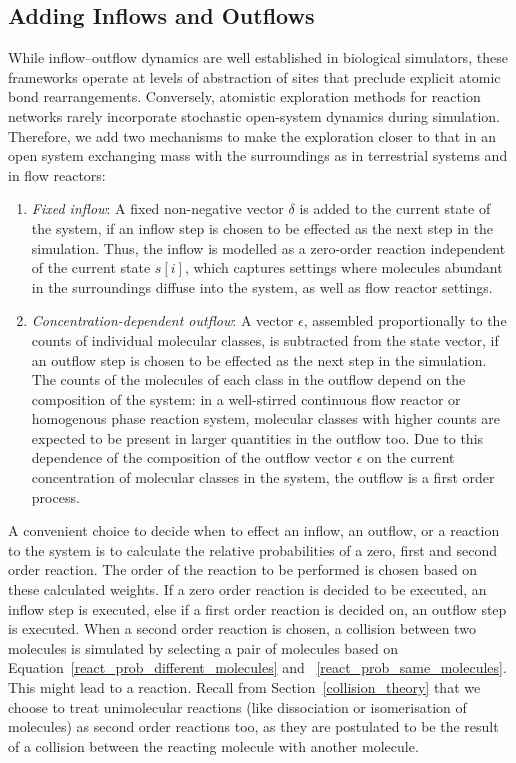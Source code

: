 \subsection{Adding Inflows and Outflows}
\label{sec:inflowOutflow}
While inflow–outflow dynamics are well established in biological simulators, these frameworks operate at levels of abstraction of sites that preclude explicit atomic bond rearrangements. Conversely, atomistic exploration methods for reaction networks rarely incorporate stochastic open-system dynamics during simulation.
Therefore, we add two mechanisms to make the exploration closer to that in an open system exchanging mass with the surroundings as in terrestrial systems and in flow reactors:

\begin{enumerate}
    \item \emph{Fixed inflow}: A fixed non-negative vector $\delta$ is added to the current state of the system, if an inflow step is chosen to be effected as the next step in the simulation. Thus, the inflow is modelled as a zero-order reaction independent of the current state $s[i]$, which captures settings where molecules abundant in the surroundings diffuse into the system, as well as flow reactor settings.
    
    \item \emph{Concentration-dependent outflow}: A vector $\epsilon$, assembled proportionally to the counts of individual molecular classes, is subtracted from the state vector, if an outflow step is chosen to be effected as the next step in the simulation. The counts of the molecules of each class in the outflow depend on the composition of the system: in a well-stirred continuous flow reactor or homogenous phase reaction system, molecular classes with higher counts are expected to be present in larger quantities in the outflow too. Due to this dependence of the composition of the outflow vector $\epsilon$ on the current concentration of molecular classes in the system, the outflow is a first order process.   
\end{enumerate}

A convenient choice to decide when to effect an inflow, an outflow, or a reaction to the system is to calculate the relative probabilities of a zero, first and second order reaction. The order of the reaction to be performed is chosen based on these calculated weights. If a zero order reaction is decided to be executed, an inflow step is executed, else if a first order reaction is decided on, an outflow step is executed. When a second order reaction is chosen, a collision between two molecules is simulated by selecting a pair of molecules based on Equation~\eqref{react_prob_different_molecules} and ~\eqref{react_prob_same_molecules}. This might lead to a reaction. Recall from Section~\ref{collision_theory} that we choose to treat unimolecular reactions (like dissociation or isomerisation of molecules) as second order reactions too, as they are postulated to be the result of a collision between the reacting molecule with another molecule.

